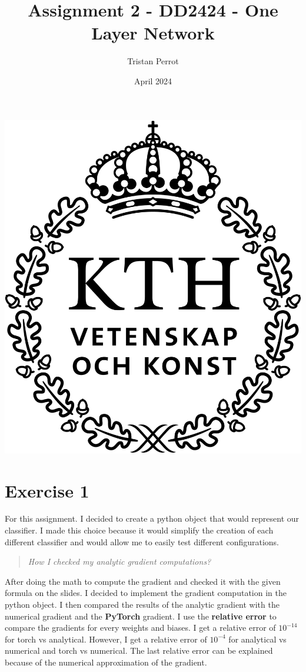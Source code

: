 \documentclass{article}
\title{Assignment 2 - DD2424 - One Layer Network}
\author{Tristan Perrot}
\date{April 2024}
\begin{document}
\maketitle
\begin{center}
    \includegraphics[scale=0.25]{images/KTH_logo_RGB_svart.png}
\end{center}

\section{Exercise 1}

For this assignment. I decided to create a python object that would represent our classifier. I made this choice because it would simplify the creation of each different classifier and would allow me to easily test different configurations.
\begin{quote}
    \textit{How I checked my analytic gradient computations?}
\end{quote}
After doing the math to compute the gradient and checked it with the given formula on the slides. I decided to implement the gradient computation in the python object. I then compared the results of the analytic gradient with the numerical gradient and the \textbf{PyTorch} gradient.
I use the \textbf{relative error} to compare the gradients for every weights and biases. I get a relative error of $10^{-14}$ for torch vs analytical. However, I get a relative error of $10^{-4}$ for analytical vs numerical and torch vs numerical. The last relative error can be explained because of the numerical approximation of the gradient.
\end{document}
